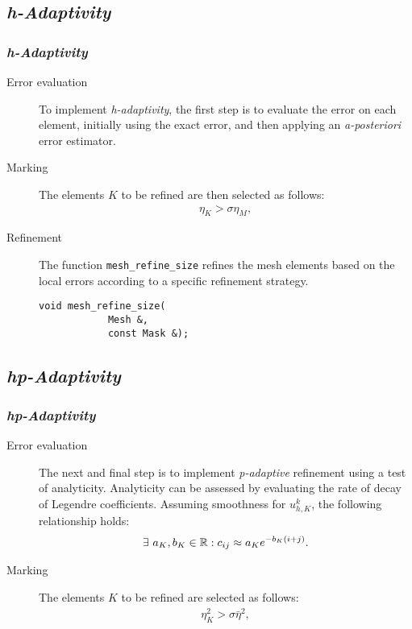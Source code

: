 \subsection{\textit{h-Adaptivity}}

\begin{frame}[fragile]
    \frametitle{\textit{h-Adaptivity}}

    \begin{description}
        \item[Error evaluation] To implement \textit{h-adaptivity}, the first step is to evaluate the error on each element, initially using the exact error, and then applying an \textit{a-posteriori} error estimator.
        \item[Marking] The elements $K$ to be refined are then selected as follows:
            \begin{gather}
                \eta_K > \sigma \eta_{M},
            \end{gather}
        \item[Refinement] The function \lstinline{mesh_refine_size} refines the mesh elements based on the local errors according to a specific refinement strategy.
        \begin{lstlisting}[style=cpp]
        void mesh_refine_size(
            Mesh &, 
            const Mask &);
        \end{lstlisting}
    \end{description}

\end{frame}

\subsection{\textit{hp-Adaptivity}}

\begin{frame}[fragile]
    \frametitle{\textit{hp-Adaptivity}}

    \begin{description}
        \item[Error evaluation] The next and final step is to implement \textit{p-adaptive} refinement using a test of analyticity. Analyticity can be assessed by evaluating the rate of decay of Legendre coefficients. Assuming smoothness for $u^k_{h, K}$, the following relationship holds:
        \begin{gather}
            \exists ~ a_K, b_K \in \mathbb{R} : c_{ij} \approx a_K e^{-b_K (i + j)}.
        \end{gather}
        \item[Marking] The elements $K$ to be refined are selected as follows:
        \begin{gather}
            \eta_K^2 > \sigma \bar{\eta}^2,
        \end{gather}
    \end{description}

\end{frame}

